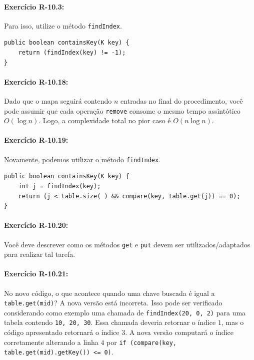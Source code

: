 \paragraph{Exercício R-10.3:}
Para isso, utilize o método \texttt{findIndex}.

\begin{lstlisting}[frame=single]
public boolean containsKey(K key) {
	return (findIndex(key) != -1);
}
\end{lstlisting}

\paragraph{Exercício R-10.18:}
Dado que o mapa seguirá contendo $n$ entradas no final do procedimento, você pode assumir que cada operação \texttt{remove} consome o mesmo tempo assintótico $O(\log n)$. Logo, a complexidade total no pior caso é $O(n \log n)$.

\paragraph{Exercício R-10.19:}
Novamente, podemos utilizar o método \texttt{findIndex}.

\begin{lstlisting}[frame=single]
public boolean containsKey(K key) {
	int j = findIndex(key);
	return (j < table.size( ) && compare(key, table.get(j)) == 0);
}
\end{lstlisting}

\paragraph{Exercício R-10.20:}
Você deve descrever como os métodos \texttt{get} e \texttt{put} devem ser utilizados/adaptados para realizar tal tarefa.

\paragraph{Exercício R-10.21:}
No novo código, o que acontece quando uma chave buscada é igual a \texttt{table.get(mid)}? A nova versão está incorreta. Isso pode ser verificado considerando como exemplo uma chamada de \texttt{findIndex(20, 0, 2)} para uma tabela contendo \texttt{{10, 20, 30}}. Essa chamada deveria retornar o índice $1$, mas o código apresentado retornará o índice $3$. A nova versão computará o índice corretamente alterando a linha $4$ por \texttt{if (compare(key, table.get(mid).getKey()) <= 0)}.

